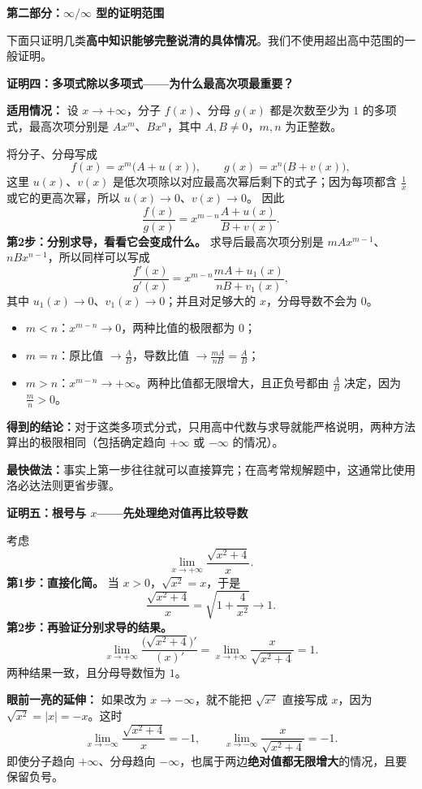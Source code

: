 \clearpage
\begin{proofbox}
\textbf{\textcolor{CProof}{第二部分：$\infty/\infty$ 型的证明范围}}

下面只证明几类\textbf{高中知识能够完整说清的具体情况}。我们不使用超出高中范围的一般证明。

\medskip
\textbf{\textcolor{CProof}{证明四：多项式除以多项式——为什么最高次项最重要？}}

\textbf{适用情况：} 设 $x\to+\infty$，分子 $f(x)$、分母 $g(x)$ 都是次数至少为 $1$ 的多项式，最高次项分别是 $Ax^m$、$Bx^n$，其中 $A,B\ne0$，$m,n$ 为正整数。

\begin{description}[style=nextline, leftmargin=2.5em, labelsep=0.4em, itemsep=0.48em]
\item[\textbf{第1步：把最高次幂提出。}]
将分子、分母写成
\[
 f(x)=x^m\bigl(A+u(x)\bigr),\qquad
 g(x)=x^n\bigl(B+v(x)\bigr),
\]
这里 $u(x)$、$v(x)$ 是低次项除以对应最高次幂后剩下的式子；因为每项都含 $\frac1x$ 或它的更高次幂，所以 $u(x)\to0$、$v(x)\to0$。
因此
\[
\frac{f(x)}{g(x)}
=x^{m-n}\frac{A+u(x)}{B+v(x)}.
\]
\textbf{第2步：分别求导，看看它会变成什么。}
求导后最高次项分别是 $mAx^{m-1}$、$nBx^{n-1}$，所以同样可以写成
\[
\frac{f'(x)}{g'(x)}
=x^{m-n}\frac{mA+u_1(x)}{nB+v_1(x)},
\]
其中 $u_1(x)\to0$、$v_1(x)\to0$；并且对足够大的 $x$，分母导数不会为 $0$。
\item[\textbf{第3步：按最高次数比较。}]
\begin{itemize}[leftmargin=*, itemsep=0.2em]
\item $m<n$：$x^{m-n}\to0$，两种比值的极限都为 $0$；
\item $m=n$：原比值 $\to\frac AB$，导数比值 $\to\frac{mA}{nB}=\frac AB$；
\item $m>n$：$x^{m-n}\to+\infty$。两种比值都无限增大，且正负号都由 $\frac AB$ 决定，因为 $\frac mn>0$。
\end{itemize}
\end{description}

\textbf{得到的结论：}对于这类多项式分式，只用高中代数与求导就能严格说明，两种方法算出的极限相同（包括确定趋向 $+\infty$ 或 $-\infty$ 的情况）。

\textbf{最快做法：}事实上第一步往往就可以直接算完；在高考常规解题中，这通常比使用洛必达法则更省步骤。
\end{proofbox}
\clearpage
\begin{proofbox}
\textbf{\textcolor{CProof}{证明五：根号与 $x$——先处理绝对值再比较导数}}

考虑
\[\lim_{x\to+\infty}\frac{\sqrt{x^2+4}}{x}.\]
\textbf{第1步：直接化简。} 当 $x>0$，$\sqrt{x^2}=x$，于是
\[
\frac{\sqrt{x^2+4}}{x}=\sqrt{1+\frac4{x^2}}\longrightarrow1.
\]
\textbf{第2步：再验证分别求导的结果。}
\[
\lim_{x\to+\infty}\frac{\bigl(\sqrt{x^2+4}\bigr)'}{(x)'}
=\lim_{x\to+\infty}\frac{x}{\sqrt{x^2+4}}=1.
\]
两种结果一致，且分母导数恒为 $1$。

\textbf{眼前一亮的延伸：} 如果改为 $x\to-\infty$，就不能把 $\sqrt{x^2}$ 直接写成 $x$，因为 $\sqrt{x^2}=|x|=-x$。这时
\[
\lim_{x\to-\infty}\frac{\sqrt{x^2+4}}{x}=-1,
\qquad
\lim_{x\to-\infty}\frac{x}{\sqrt{x^2+4}}=-1.
\]
即使分子趋向 $+\infty$、分母趋向 $-\infty$，也属于两边\textbf{绝对值都无限增大}的情况，且要保留负号。
\end{proofbox}
